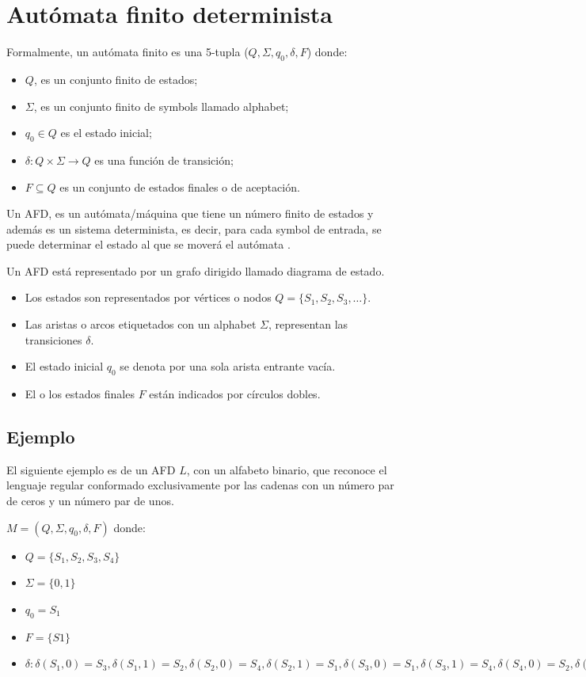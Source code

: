 \section{Autómata finito determinista}\label{FiniteAutomaton}
Formalmente, un autómata finito es una 5-tupla ($Q, \Sigma, q_{0}, \delta, F$) donde:

\begin{itemize}
	\item $Q$, es un conjunto finito de estados;
	\item $\Sigma$, es un conjunto finito de \glspl{symbol} llamado \gls{alphabet};
	\item $q_{0}\in Q$ es el estado inicial;
	\item $\delta \colon Q\times \Sigma \to Q$ es una función de transición;
	\item $F\subseteq Q$ es un conjunto de estados finales o de aceptación.
\end{itemize}

Un \acrfull{AFD}, es un autómata/máquina que tiene un número finito de estados y además es un sistema determinista, es decir, para cada \gls{symbol} de entrada, se puede determinar el estado al que se moverá el autómata \cite{wiki:Automata_finito}. 

Un \acrshort{AFD} está representado por un grafo dirigido llamado diagrama de estado.

\begin{itemize}
	\item Los estados son representados por vértices o nodos $Q = \{ S_1, S_2, S_3, \dots \}$.
	\item Las aristas o arcos etiquetados con un \gls{alphabet} $\Sigma$, representan las transiciones $\delta$.
	\item El estado inicial $q_{0}$ se denota por una sola arista entrante vacía.
	\item El o los estados finales $F$ están indicados por círculos dobles.
\end{itemize}

\subsection{Ejemplo}
El siguiente ejemplo es de un \acrshort{AFD} $L$, con un alfabeto binario, que reconoce el lenguaje regular conformado exclusivamente por las cadenas con un número par de ceros y un número par de unos.

$M = (Q, \Sigma, q_{0}, \delta, F)$ donde:
\begin{itemize}
	\item $Q = \{S_1, S_2, S_3, S_4 \}$
	\item $\Sigma = \{ 0, 1 \}$
	\item $q_0 = S_1$
	\item $F = \{ S1 \}$
	\item $\delta:  
			\delta(S_1, 0) = S_3, 
			\delta(S_1, 1) = S_2,
			\delta(S_2, 0) = S_4,
			\delta(S_2, 1) = S_1,
			\delta(S_3, 0) = S_1,
			\delta(S_3, 1) = S_4,
			\delta(S_4, 0) = S_2,
			\delta(S_4, 1) = S_3
		$
\end{itemize}


